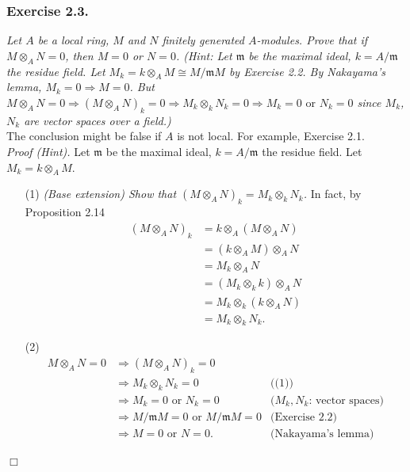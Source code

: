 \documentclass{article}
\begin{document}



\subsubsection*{Exercise 2.3.}
\emph{Let $A$ be a local ring, $M$ and $N$ finitely generated $A$-modules.
Prove that if $M \otimes_{A} N = 0$, then $M = 0$ or $N = 0$.
(Hint: Let $\mathfrak{m}$ be the maximal ideal,
$k = A/\mathfrak{m}$ the residue field.
Let $M_k = k \otimes_{A} M \cong M/\mathfrak{m}M$ by Exercise 2.2.
By Nakayama's lemma, $M_k = 0 \Longrightarrow M = 0$.
But
$M \otimes_{A} N = 0
\Longrightarrow
(M \otimes_{A} N)_k = 0
\Longrightarrow
M_k \otimes_k N_k = 0
\Longrightarrow
M_k = 0 \text{ or } N_k = 0$
since $M_k$, $N_k$ are vector spaces over a field.)} \\

The conclusion might be false if $A$ is not local. For example, Exercise 2.1. \\



\emph{Proof (Hint).}
Let $\mathfrak{m}$ be the maximal ideal,
$k = A/\mathfrak{m}$ the residue field.
Let $M_k = k \otimes_{A} M$.
\begin{enumerate}
\item[(1)]
\emph{(Base extension) Show that
$(M \otimes_{A} N)_k = M_k \otimes_{k} N_k$.}
In fact, by Proposition 2.14
\begin{align*}
(M \otimes_{A} N)_k
&= k \otimes_{A} (M \otimes_{A} N) \\
&= (k \otimes_{A} M) \otimes_{A} N \\
&= M_k \otimes_{A} N \\
&= (M_k \otimes_{k} k) \otimes_{A} N \\
&= M_k \otimes_{k} (k \otimes_{A} N) \\
&= M_k \otimes_{k} N_k.
\end{align*}
\item[(2)]
\begin{align*}
M \otimes_{A} N = 0
&\Longrightarrow
(M \otimes_{A} N)_k = 0 \\
&\Longrightarrow
M_k \otimes_k N_k = 0
  &\text{((1))} \\
&\Longrightarrow
M_k = 0 \text{ or } N_k = 0
  &\text{($M_k, N_k$: vector spaces)} \\
&\Longrightarrow
M/\mathfrak{m}M = 0 \text{ or } M/\mathfrak{m}M = 0
  &\text{(Exercise 2.2)} \\
&\Longrightarrow
M = 0 \text{ or } N = 0.
  &\text{(Nakayama's lemma)} \\
\end{align*}
\end{enumerate}
$\Box$ \\\\
\end{document}
